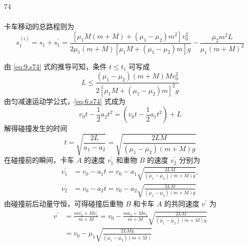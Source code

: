 \begin{solution}{74}
\begin{subsolution}
\begin{subsubsolution}
\begin{align}
            \end{align}
            卡车移动的总路程则为
            \begin{equation}
                s_{1}^{(i)} = s_{1} + s_{1}^{\prime} = \frac{[ \mu_{1} M (m + M) + (\mu_{1} - \mu_{2}) m^{2} ] v_{0}^{2}}{2 \mu_{1} (m + M) [ \mu_{1} M + (\mu_{1} - \mu_{2}) m ] g} - \frac{\mu_{2} m^{2} L}{\mu_{1} (m + M)^{2}}
                \label{eq:15.s74}
            \end{equation}
        \end{subsubsolution}
        \begin{subsubsolution}
            由 \eqref{eq:9.s74} 式的推导可知，条件 $t \leq t_{1}$ 可写成
            \begin{equation}
                L \leq \frac{(\mu_{1} - \mu_{2})(m + M) M v_{0}^{2}}{2 [ \mu_{1} M + (\mu_{1} - \mu_{2}) m ]^{2} g}
            \end{equation}
            由匀减速运动学公式，\eqref{eq:6.s74} 式成为
            \begin{equation}
                v_{0} t - \frac{1}{2} a_{2} t^{2} = \left(v_{0} t - \frac{1}{2} a_{1} t^{2}\right) + L
            \end{equation}
            解得碰撞发生的时间
            \begin{equation}
                t = \sqrt{\frac{2 L}{a_{1} - a_{2}}} = \sqrt{\frac{2 L M}{(\mu_{1} - \mu_{2})(m + M) g}}
            \end{equation}
            在碰撞前的瞬间，卡车 $A$ 的速度 $v_{1}^{\prime}$ 和重物 $B$ 的速度 $v_{2}^{\prime}$ 分别为
            \begin{align}
                v_{1}^{\prime} &= v_{0} - a_{1} t = v_{0} - a_{1} \sqrt{\frac{2 L M}{(\mu_{1} - \mu_{2})(m + M) g}}, \\
                v_{2}^{\prime} &= v_{0} - a_{2} t = v_{0} - a_{2} \sqrt{\frac{2 L M}{(\mu_{1} - \mu_{2})(m + M) g}}
                \label{eq:16.s74}
            \end{align}
            由碰撞前后动量守恒，可得碰撞后重物 $B$ 和卡车 $A$ 的共同速度 $v^{\prime}$ 为
            \begin{align}
                v^{\prime} &= \frac{m v_{2}^{\prime} + M v_{1}^{\prime}}{m + M} = v_{0} - \frac{m a_{2} + M a_{1}}{m + M} \sqrt{\frac{2 L M}{(\mu_{1} - \mu_{2})(m + M) g}} \nonumber \\
                &= v_{0} - \mu_{1} \sqrt{\frac{2 L M g}{(\mu_{1} - \mu_{2})(m + M)}}
                \label{eq:17.s74}
            \end{align}

\end{subsubsolution}
\end{subsolution}
\end{solution}
